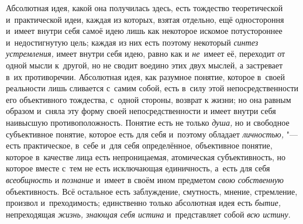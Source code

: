 Абсолютная идея, какой она получилась здесь, есть тождество
теоретической и~практической идеи, каждая из которых, взятая отдельно, ещё
одностороння и~имеет внутри себя самоё идею лишь как некоторое искомое
потустороннее и~недостигнутую цель; каждая из них есть поэтому некоторый
{\em синтез устремления,}
имеет внутри себя идею, равно как и
{\em не}~имеет её,
переходит от одной мысли к~другой, но не сводит воедино этих двух мыслей, а
застревает в~их противоречии. Абсолютная идея, как разумное понятие,
которое в~своей реальности лишь сливается с~самим собой, есть в~силу этой
непосредственности его объективного тождества, с~одной стороны, возврат к
жизни; но она равным образом и~сняла эту форму своей непосредственности и
имеет внутри себя наивысшую противоположность. Понятие есть не только
{\em душа,} но и
свободное субъективное понятие, которое есть для себя и~поэтому обладает
{\em личностью,} "--- есть
практическое, в~себе и~для себя определённое, объективное понятие, которое
в~качестве лица есть непроницаемая, атомическая субъективность, но которое
вместе с~тем не есть исключающая единичность, а~есть для себя
{\em всеобщность} и
{\em познание} и~имеет в
своём ином предметом {\em свою
собственную} объективность. Всё остальное есть заблуждение,
смутность, мнение, стремление, произвол и~преходимость; единственно только
абсолютная идея есть {\em бытие,}
непреходящая {\em жизнь,
знающая себя истина} и~представляет собой
{\em всю истину}.

